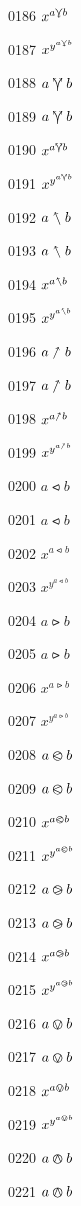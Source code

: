 \documentclass{article}
\begin{document}
0186 $x^{a\curlyveedownarrow b}$\par
0187 $x^{y^{a\curlyveedownarrow b}}$\par
0188 $a\curlyveeuparrow b$\par
0189 $\displaystyle a\curlyveeuparrow b$\par
0190 $x^{a\curlyveeuparrow b}$\par
0191 $x^{y^{a\curlyveeuparrow b}}$\par
0192 $a\nnwarrow b$\par
0193 $\displaystyle a\nnwarrow b$\par
0194 $x^{a\nnwarrow b}$\par
0195 $x^{y^{a\nnwarrow b}}$\par
0196 $a\nnearrow b$\par
0197 $\displaystyle a\nnearrow b$\par
0198 $x^{a\nnearrow b}$\par
0199 $x^{y^{a\nnearrow b}}$\par
0200 $a\leftslice b$\par
0201 $\displaystyle a\leftslice b$\par
0202 $x^{a\leftslice b}$\par
0203 $x^{y^{a\leftslice b}}$\par
0204 $a\rightslice b$\par
0205 $\displaystyle a\rightslice b$\par
0206 $x^{a\rightslice b}$\par
0207 $x^{y^{a\rightslice b}}$\par
0208 $a\varolessthan b$\par
0209 $\displaystyle a\varolessthan b$\par
0210 $x^{a\varolessthan b}$\par
0211 $x^{y^{a\varolessthan b}}$\par
0212 $a\varogreaterthan b$\par
0213 $\displaystyle a\varogreaterthan b$\par
0214 $x^{a\varogreaterthan b}$\par
0215 $x^{y^{a\varogreaterthan b}}$\par
0216 $a\varovee b$\par
0217 $\displaystyle a\varovee b$\par
0218 $x^{a\varovee b}$\par
0219 $x^{y^{a\varovee b}}$\par
0220 $a\varowedge b$\par
0221 $\displaystyle a\varowedge b$\par
\end{document}
